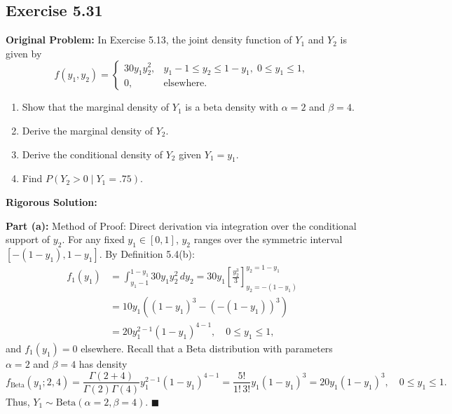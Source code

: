 \documentclass[11pt, letterpaper]{article}
\theoremstyle{definition}
\theoremstyle{remark}
\begin{document}
\subsection{Exercise 5.31}

\textbf{Original Problem:}
In Exercise 5.13, the joint density function of $Y_1$ and $Y_2$ is given by
\[ f(y_1, y_2) = \begin{cases} 30y_1 y_2^2, & y_1 - 1 \le y_2 \le 1 - y_1, \; 0 \le y_1 \le 1, \\ 0, & \text{elsewhere.} \end{cases} \]
\begin{enumerate}[label=\textbf{\alph*}]
    \item Show that the marginal density of $Y_1$ is a beta density with $\alpha = 2$ and $\beta = 4$.
    \item Derive the marginal density of $Y_2$.
    \item Derive the conditional density of $Y_2$ given $Y_1 = y_1$.
    \item Find $P(Y_2 > 0 \mid Y_1 = .75)$.
\end{enumerate}

\textbf{Rigorous Solution:}

\textbf{Part (a):} Method of Proof: Direct derivation via integration over the conditional support of $y_2$.
For any fixed $y_1 \in [0, 1]$, $y_2$ ranges over the symmetric interval $[-(1 - y_1), 1 - y_1]$. By Definition 5.4(b):
\begin{align*}
    f_1(y_1) &= \int_{y_1 - 1}^{1 - y_1} 30y_1 y_2^2 \, dy_2 = 30y_1 \left[ \frac{y_2^3}{3} \right]_{y_2 = -(1 - y_1)}^{y_2 = 1 - y_1} \\
    &= 10y_1 \left( (1 - y_1)^3 - (-(1 - y_1))^3 \right) \\
    &= 20 y_1^{2-1} (1 - y_1)^{4-1}, \quad 0 \le y_1 \le 1,
\end{align*}
and $f_1(y_1) = 0$ elsewhere. Recall that a Beta distribution with parameters $\alpha = 2$ and $\beta = 4$ has density
\[ f_{\text{Beta}}(y_1; 2, 4) = \frac{\Gamma(2 + 4)}{\Gamma(2)\Gamma(4)} y_1^{2-1}(1 - y_1)^{4-1} = \frac{5!}{1! \, 3!} y_1(1 - y_1)^3 = 20y_1(1 - y_1)^3, \quad 0 \le y_1 \le 1. \]
Thus, $Y_1 \sim \text{Beta}(\alpha = 2, \beta = 4)$. $\blacksquare$
\end{document}
